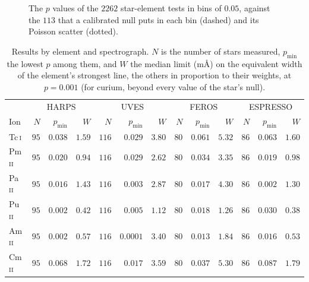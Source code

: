 \documentclass[3p,11pt]{elsarticle}
\newcommand{\ion}[2]{#1\,\textsc{#2}}
\begin{document}
\begin{figure}[tp]
\centering
{}
\caption{The $p$ values of the $2262$ star-element tests in bins of $0.05$, against the
$113$ that a calibrated null puts in each bin (dashed) and its Poisson scatter
(dotted).}
\label{fig:pvals}
\end{figure}

\begin{table}[t]
\centering\small
\setlength{\tabcolsep}{4pt}
\caption{Results by element and spectrograph. $N$ is the number of stars measured,
$p_\mathrm{min}$ the lowest $p$ among them, and $W$ the median limit (m\AA) on the
equivalent width of the element's strongest line, the others in proportion to their
weights, at $p=0.001$ (for curium, beyond every value of the star's null).}
\label{tab:results}
\begin{tabular}{l rrr rrr rrr rrr}
\toprule
 & \multicolumn{3}{c}{HARPS} & \multicolumn{3}{c}{UVES} & \multicolumn{3}{c}{FEROS} & \multicolumn{3}{c}{ESPRESSO} \\
Ion & $N$ & $p_\mathrm{min}$ & $W$ & $N$ & $p_\mathrm{min}$ & $W$ & $N$ & $p_\mathrm{min}$ & $W$ & $N$ & $p_\mathrm{min}$ & $W$ \\
\midrule
\ion{Tc}{i} & $95$ & $0.038$ & $1.59$ & $116$ & $0.029$ & $3.80$ & $80$ & $0.061$ & $5.32$ & $86$ & $0.063$ & $1.60$ \\
\ion{Pm}{ii} & $95$ & $0.020$ & $0.94$ & $116$ & $0.029$ & $2.62$ & $80$ & $0.034$ & $3.35$ & $86$ & $0.019$ & $0.98$ \\
\ion{Pa}{ii} & $95$ & $0.016$ & $1.43$ & $116$ & $0.003$ & $2.87$ & $80$ & $0.017$ & $4.30$ & $86$ & $0.002$ & $1.30$ \\
\ion{Pu}{ii} & $95$ & $0.002$ & $0.42$ & $116$ & $0.005$ & $1.12$ & $80$ & $0.018$ & $1.26$ & $86$ & $0.030$ & $0.38$ \\
\ion{Am}{ii} & $95$ & $0.002$ & $0.57$ & $116$ & $0.0001$ & $3.40$ & $80$ & $0.013$ & $1.84$ & $86$ & $0.016$ & $0.53$ \\
\ion{Cm}{ii} & $95$ & $0.068$ & $1.72$ & $116$ & $0.017$ & $3.59$ & $80$ & $0.037$ & $5.30$ & $86$ & $0.087$ & $1.79$ \\
\bottomrule
\end{tabular}
\end{table}
\end{document}

